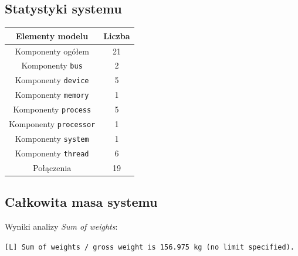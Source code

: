 \documentclass{article}
\begin{document}
\subsection{Statystyki systemu}


\begin{center}
    \begin{tabular}{|c|c|}
        \hline
        \textbf{Elementy modelu} & \textbf{Liczba} \\
        \hline
        Komponenty ogółem & 21 \\
        Komponenty \texttt{bus} & 2 \\
        Komponenty \texttt{device} & 5 \\
        Komponenty \texttt{memory} & 1 \\
        Komponenty \texttt{process} & 5 \\
        Komponenty \texttt{processor} & 1 \\
        Komponenty \texttt{system} & 1 \\
        Komponenty \texttt{thread} & 6 \\
        Połączenia & 19 \\
        \hline
    \end{tabular}
\end{center}

\subsection{Całkowita masa systemu}

Wyniki analizy \textit{Sum of weights}:
\newline

\texttt{[L] Sum of weights / gross weight is 156.975 kg (no limit specified).}
\end{document}
